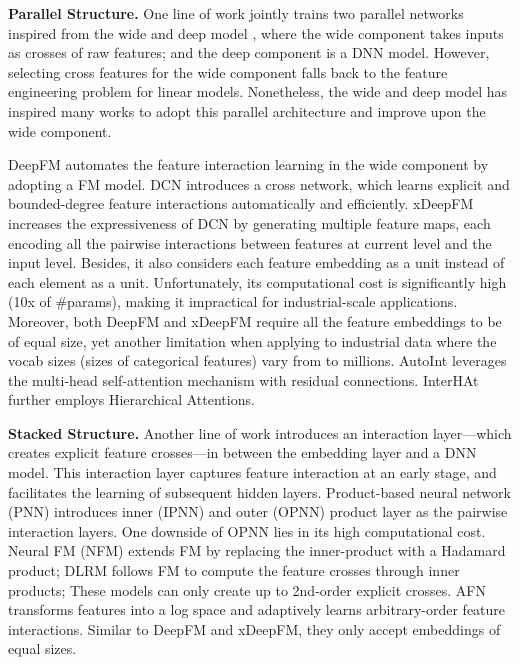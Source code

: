 \documentclass[sigconf]{acmart}
\begin{document}
{\bf Parallel Structure.} One line of work jointly trains two parallel networks inspired from
the wide and deep model \cite{cheng2016wide}, where the wide component takes inputs as crosses of raw features; and the deep component is a DNN model. However, selecting cross features for the wide component falls back to the feature engineering problem for linear models. Nonetheless, the wide and deep model has inspired many works to adopt this parallel architecture and improve upon the wide component. 

DeepFM \cite{guo2017deepfm} automates the feature interaction learning in the wide component by adopting a FM model. DCN \cite{wang2017deep} introduces a cross network, which learns explicit and bounded-degree feature interactions automatically and efficiently. xDeepFM \cite{lian2018xdeepfm} increases the expressiveness of DCN by generating multiple feature maps, each encoding all the pairwise interactions between features at current level and the input level. Besides, it also considers each feature embedding  as a unit instead of each element  as a unit. Unfortunately, its computational cost is significantly high (10x of \#params), making it impractical for industrial-scale applications. Moreover, both DeepFM and xDeepFM require all the feature embeddings to be of equal size, yet another limitation when applying to industrial data where the vocab sizes (sizes of categorical features) vary from  to millions. AutoInt \cite{song2019autoint} leverages the multi-head self-attention mechanism with residual connections. InterHAt \cite{li2020interpretable} further employs Hierarchical Attentions.

{\bf Stacked Structure.} Another line of work introduces an interaction layer---which creates explicit feature crosses---in between the embedding layer and a DNN model. This interaction layer captures feature interaction at an early stage, and facilitates the learning of subsequent hidden layers. Product-based neural network (PNN) \cite{qu2016product} introduces inner (IPNN) and outer (OPNN) product layer as the pairwise interaction layers. One downside of OPNN lies in its high computational cost. Neural FM (NFM) \cite{he2017neural} extends FM by replacing the inner-product with a Hadamard product;
DLRM \cite{naumov2019deep} follows FM to compute the feature crosses through inner products;
These models can only create up to 2nd-order explicit crosses. AFN \cite{cheng2019adaptive} transforms features into a log space and adaptively learns arbitrary-order feature interactions. Similar to DeepFM and xDeepFM, they only accept embeddings of equal sizes.
\end{document}

